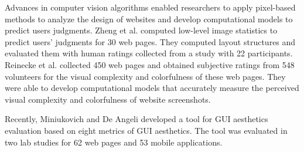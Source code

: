 Advances in computer vision algorithms enabled researchers to
apply pixel-based methods to analyze the design of websites and develop computational models to predict users judgments.
Zheng et al. \cite{zheng_2009_CHI_correlating} computed low-level image statistics to predict users' judgments for 30 web pages.
They computed layout structures and evaluated them with human ratings collected from a study with 22 participants.
Reinecke et al. \cite{reinecke_2013_CHI} collected 450 web pages and obtained subjective ratings from 548 volunteers for the visual complexity and colorfulness of these web pages.
They were able to develop computational models that accurately measure the perceived visual complexity and colorfulness of website screenshots.

Recently, Miniukovich and De Angeli \cite{Miniukovich_CHI_2015} developed a tool for GUI aesthetics evaluation based on eight metrics of GUI aesthetics.
The tool was evaluated in two lab studies for 62 web pages and 53 mobile applications. 
